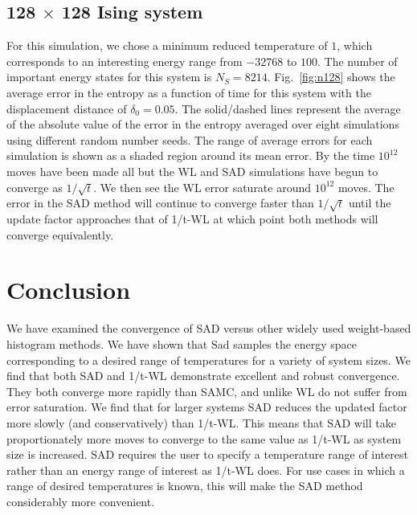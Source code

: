 \documentclass[letterpaper,twocolumn,amsmath,amssymb,pre,aps,10pt]{revtex4-1}
\begin{document}
\subsection{128 $\times$ 128 Ising system}
For this simulation, we chose a minimum reduced temperature of $1$, which
corresponds to an interesting energy range from $-32768$ to $100$.  The number of
important energy states for this system is $N_S = 8214$.
Fig.~\ref{fig:n128} shows the average error in the entropy as a function of time
for this system with the displacement distance of $\delta_0 = 0.05$. The solid/dashed
lines represent the average of the absolute value of the error in the entropy
averaged over eight simulations using different random number seeds. The range
of average errors for each simulation is shown as a shaded region around its
mean error. By the time $10^{12}$ moves have been made all but the WL and SAD
simulations have begun to converge as $1/\sqrt{t}$. We then see the WL error
saturate around $10^{12}$ moves. The error in the SAD method will continue to
converge faster than $1/\sqrt{t}$ until the update factor approaches that of
1/t-WL at which point both methods will converge equivalently.

\section{Conclusion}
We have examined the convergence of SAD versus other widely used weight-based
histogram methods.  We have shown that Sad samples the energy space
corresponding to a desired range of temperatures for a variety of system sizes.
We find that both SAD and 1/t-WL demonstrate excellent and robust convergence.
They both converge more rapidly than SAMC, and unlike WL do not suffer from
error saturation. We find that for larger systems SAD reduces the updated factor
more slowly (and conservatively) than 1/t-WL. This means that SAD will take
proportionately more moves to converge to the same value as 1/t-WL as system
size is increased. SAD requires the user to specify a temperature range of
interest rather than an energy range of interest as 1/t-WL does. For use cases
in which a range of desired temperatures is known, this will make the SAD method
considerably more convenient.

\end{document}
